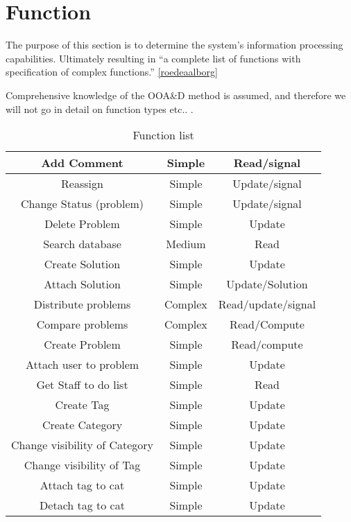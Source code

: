 \section{Function}
The purpose of this section is to determine the system's information processing capabilities. Ultimately resulting in ``a complete list of functions with specification of complex functions.'' \ref{roedeaalborg} 

Comprehensive knowledge of the OOA&D method is assumed, and therefore we will not go in detail on function types etc.. .

\begin{table}[htdp]
\caption{Function list}
\begin{center}
\begin{tabular}{|c|c|c|}
\hline
Add Comment &   Simple & Read/signal   \\ \hline%
Reassign & Simple   & Update/signal \\ \hline%
Change Status (problem) &   Simple & Update/signal \\ \hline%
Delete Problem & Simple &   Update \\   \hline%
Search database & Medium &   Read \\ \hline%
Create Solution & Simple &   Update \\   \hline%
Attach Solution & Simple &   Update/Solution \\   \hline%
Distribute problems &   Complex & Read/update/signal \\   \hline%
Compare problems & Complex & Read/Compute \\ \hline%
Create Problem &   Simple & Read/compute \\   \hline%
Attach user to problem & Simple & Update \\ \hline%
Get Staff to do list & Simple & Read \\   \hline%
Create Tag & Simple &   Update \\ \hline%
Create Category & Simple & Update \\ \hline%
Change visibility of Category &   Simple &   Update \\   \hline%
Change visibility of Tag &   Simple &  Update \\ \hline%
Attach tag to cat & Simple & Update \\ \hline%
Detach tag to cat & Simple & Update \\ \hline%

\end{tabular}
\end{center}
\end{table}
